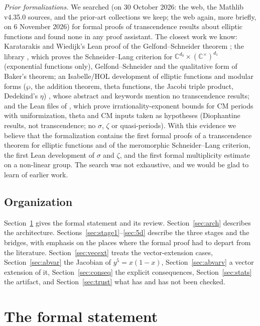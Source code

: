 \documentclass[11pt]{amsart}
\theoremstyle{definition}
\theoremstyle{remark}
\numberwithin{equation}{section}
\newcommand{\CC}{\mathbb{C}}
\begin{document}
\emph{Prior formalizations.} We searched (on 30 October 2026: the web, the Mathlib v4.35.0 sources,
and the prior-art collections we keep; the web again, more briefly, on 6 November 2026) for formal proofs of transcendence results about elliptic
functions and found none in any proof assistant. The closest work we know: Karatarakis and
Wiedijk's Lean proof of the Gelfond--Schneider theorem \cite{KaratarakisWiedijk2026}; the library
\cite{DiazModulus}, which proves the Schneider--Lang criterion for $\CC^{d_0}\times(\CC^\times)^{d_1}$
(exponential functions only), Gelfond--Schneider and the qualitative form of Baker's theorem;
an Isabelle/HOL development of elliptic functions and modular forms ($\wp$, the addition theorem,
theta functions, the Jacobi triple product, Dedekind's $\eta$) \cite{EberlLiPaulson2026}, whose
abstract and keywords mention no transcendence results; and the Lean files of
\cite{ChCh26}, which prove irrationality-exponent bounds for CM periods with uniformization, theta
and CM inputs taken as hypotheses (Diophantine results, not transcendence; no $\sigma$, $\zeta$ or
quasi-periods). With this evidence we believe that the formalization contains the first formal
proofs of a transcendence theorem for elliptic functions and of the meromorphic Schneider--Lang
criterion, the first Lean development of $\sigma$ and $\zeta$, and the first formal multiplicity
estimate on a non-linear group. The search was not exhaustive, and we would be glad to learn of
earlier work.

\subsection{Organization}
Section~\ref{sec:statement} gives the formal statement and its review. Section~\ref{sec:arch}
describes the architecture. Sections~\ref{sec:stage1}--\ref{sec:5d} describe the three stages and
the bridges, with emphasis on the places where the formal proof had to depart from the literature.
Section~\ref{sec:vecext} treats the vector-extension cases, Section~\ref{sec:abvar} the Jacobian
of $y^5=x(1-x)$, Section~\ref{sec:abvarv} a vector extension of it, Section~\ref{sec:conseq} the explicit consequences,
Section~\ref{sec:stats} the artifact, and Section~\ref{sec:trust} what has and has not been checked.

\section{The formal statement}\label{sec:statement}
\end{document}
